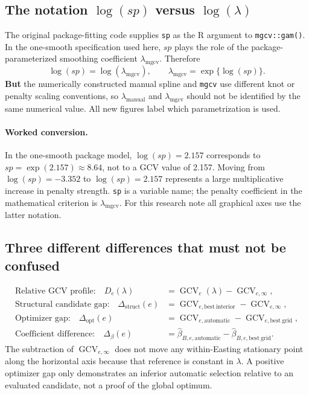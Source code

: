 \documentclass[10pt,letterpaper]{article}
\begin{document}
\subsection{The notation \(\log(sp)\) versus \(\log(\lambda)\)}
The original package-fitting code supplies \texttt{sp} as the R argument to \texttt{mgcv::gam()}. In the one-smooth specification used here, \(sp\) plays the role of the package-parameterized smoothing coefficient \(\lambda_{\mathrm{mgcv}}\). Therefore
\begin{equation}
\log(sp)=\log(\lambda_{\mathrm{mgcv}}), \qquad
\lambda_{\mathrm{mgcv}}=\exp\{\log(sp)\}.
\end{equation}
\textbf{But} the numerically constructed manual spline and \texttt{mgcv} use different knot or penalty scaling conventions, so \(\lambda_{\mathrm{manual}}\) and \(\lambda_{\mathrm{mgcv}}\) should not be identified by the same numerical value. All new figures label which parametrization is used.

\paragraph{Worked conversion.} In the one-smooth package model, \(\log(sp)=2.157\) corresponds to \(sp=\exp(2.157)\approx8.64\), not to a GCV value of 2.157. Moving from \(\log(sp)=-3.352\) to \(\log(sp)=2.157\) represents a large multiplicative increase in penalty strength. \texttt{sp} is a variable name; the penalty coefficient in the mathematical criterion is \(\lambda_{\mathrm{mgcv}}\). For this research note all graphical axes use the latter notation.


\subsection{Three different differences that must not be confused}
\begin{align}
\text{Relative GCV profile:}\quad D_e(\lambda)&=\operatorname{GCV}_e(\lambda)-\operatorname{GCV}_{e,\infty},\\
\text{Structural candidate gap:}\quad\Delta_{\mathrm{struct}}(e)&=\operatorname{GCV}_{e,\mathrm{best\ interior}}-\operatorname{GCV}_{e,\infty},\\
\text{Optimizer gap:}\quad\Delta_{\mathrm{opt}}(e)&=\operatorname{GCV}_{e,\mathrm{automatic}}-\operatorname{GCV}_{e,\mathrm{best\ grid}},\\
\text{Coefficient difference:}\quad\Delta_\beta(e)&=\widehat\beta_{B,e,\mathrm{automatic}}-\widehat\beta_{B,e,\mathrm{best\ grid}}.
\end{align}
The subtraction of \(\operatorname{GCV}_{e,\infty}\) does not move any within-Easting stationary point along the horizontal axis because that reference is constant in \(\lambda\). A positive optimizer gap only demonstrates an inferior automatic selection relative to an evaluated candidate, not a proof of the global optimum.
\end{document}
